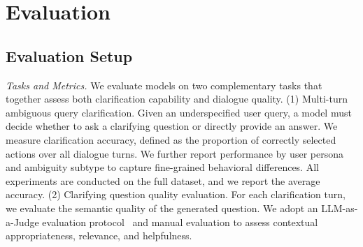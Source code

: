 \documentclass[sigconf]{acmart}
\newcommand{\rsc}{\textsc{RSC}\xspace}
\begin{document}
\section{Evaluation}

\subsection{Evaluation Setup}



 





\textit{Tasks and Metrics.}
We evaluate models on two complementary tasks that together assess both clarification capability and dialogue quality.
(1) Multi-turn ambiguous query clarification.
Given an underspecified user query, a model must decide whether to ask a clarifying question or directly provide an answer.
We measure clarification accuracy, defined as the proportion of correctly selected actions over all dialogue turns.
We further report performance by user persona and ambiguity subtype to capture fine-grained behavioral differences.
All experiments are conducted on the full dataset, and we report the average accuracy.
(2) Clarifying question quality evaluation.
For each clarification turn, we evaluate the semantic quality of the generated question.
We adopt an LLM-as-a-Judge evaluation protocol~\cite{li2025generation} and manual evaluation to assess contextual appropriateness, relevance, and helpfulness.
\end{document}
